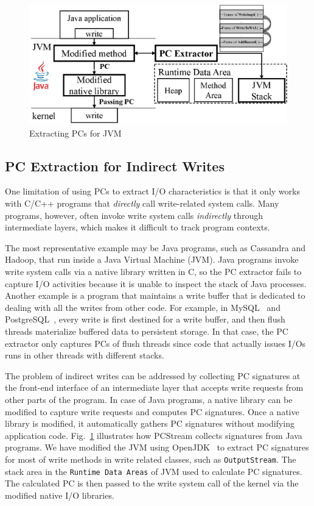 \begin{figure}[t]
\centering
	\includegraphics[width=0.8\linewidth]{figure/jvmpc}
	\caption{
	Extracting PCs for JVM
	}
\label{fig:java}
\end{figure}


\subsection{PC Extraction for Indirect Writes}
One limitation of using PCs to extract I/O characteristics is that it only
works with C/C++ programs that \textit{directly} call write-related system
calls.  Many programs, however, often invoke write system calls
\textit{indirectly} through intermediate layers, which makes it difficult to
track program contexts.

The most representative example may be Java programs, such as Cassandra and
Hadoop, that run inside a Java Virtual Machine (JVM). Java programs invoke
write system calls via a native library written in C, so the PC extractor fails
to capture I/O activities because it is unable to inspect the stack of Java
processes.  Another example is a program that maintains a write buffer that is
dedicated to dealing with all the writes from other code. For example, in
MySQL~\cite{MySQL} and PostgreSQL~\cite{PostgreSQL}, every write is first
destined for a write buffer, and then flush threads materialize buffered data
to persistent storage.  In that case, the PC extractor only captures PCs of
flush threads since code that actually issues I/Os runs in other threads with
different stacks.

The problem of indirect writes can be addressed by collecting PC signatures at
the front-end interface of an intermediate layer that accepts write requests
from other parts of the program. In case of Java programs, a native library can
be modified to capture write requests and computes PC signatures. Once a native
library is modified, it automatically gathers PC signatures without modifying
application code. Fig.~\ref{fig:java} illustrates how \textsf{PCStream}
collects signatures from Java programs.  We have modified the JVM using
OpenJDK~\cite{OpenJDK} to extract PC signatures for most of write methods in
write related classes, such as \texttt{OutputStream}.  The stack area in the
\texttt{Runtime Data Areas} of JVM used to calculate PC signatures.  The
calculated PC is then passed to the write system call of the kernel via the
modified native I/O libraries.

